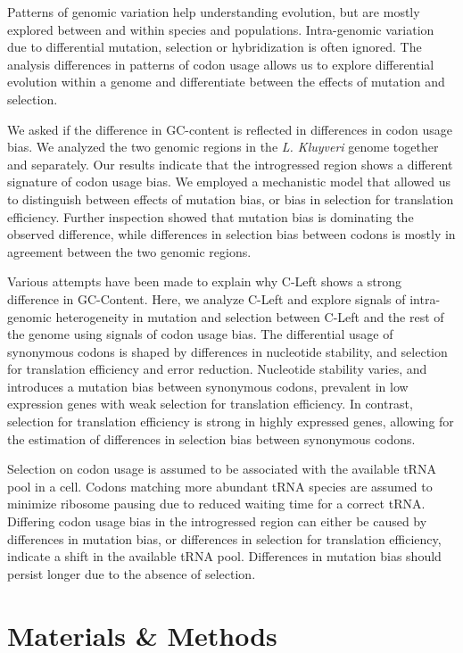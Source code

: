 \documentclass[12pt,draft]{article}
\begin{document}
Patterns of genomic variation help understanding evolution, but are mostly explored between and within species and populations.
Intra-genomic variation due to differential mutation, selection or hybridization is often ignored.
The analysis differences in patterns of codon usage allows us to explore differential evolution within a genome and differentiate between the effects of mutation and selection.

We asked if the difference in GC-content is reflected in differences in codon usage bias.
We analyzed the two genomic regions in the \textit{L. Kluyveri} genome together and separately.
Our results indicate that the introgressed region shows a different signature of codon usage bias.
We employed a mechanistic model that allowed us to distinguish between effects of mutation bias, or bias in selection for translation efficiency.
Further inspection showed that mutation bias is dominating the observed difference, while differences in selection bias between codons is mostly in agreement between the two genomic regions. 

Various attempts have been made to explain why C-Left shows a strong difference in GC-Content.
Here, we analyze C-Left and explore signals of intra-genomic heterogeneity in mutation and selection between C-Left and the rest of the genome using signals of codon usage bias.
The differential usage of synonymous codons is shaped by differences in nucleotide stability, and selection for translation efficiency and error reduction.
Nucleotide stability varies, and introduces a mutation bias between synonymous codons, prevalent in low expression genes with weak selection for translation efficiency.
In contrast, selection for translation efficiency is strong in highly expressed genes, allowing for the estimation of differences in selection bias between synonymous codons.

Selection on codon usage is assumed to be associated with the available tRNA pool in a cell. 
Codons matching more abundant tRNA species are assumed to minimize ribosome pausing due to reduced waiting time for a correct tRNA. 
Differing codon usage bias in the introgressed region can either be caused by differences in mutation bias, or differences in selection for translation efficiency, indicate a shift in the available tRNA pool.
Differences in mutation bias should persist longer due to the absence of selection.   

	
\section{Materials \& Methods}
\end{document}
